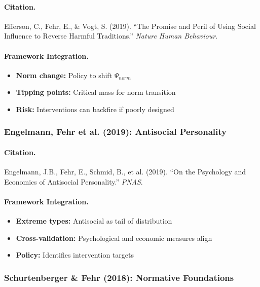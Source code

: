 \documentclass[12pt,a4paper]{article}
\begin{document}
\paragraph{Citation.}
Efferson, C., Fehr, E., \& Vogt, S. (2019).
``The Promise and Peril of Using Social Influence to Reverse Harmful Traditions.''
\emph{Nature Human Behaviour}.

\paragraph{Framework Integration.}
\begin{itemize}
  \item \textbf{Norm change:} Policy to shift $\Psi_{norm}$
  \item \textbf{Tipping points:} Critical mass for norm transition
  \item \textbf{Risk:} Interventions can backfire if poorly designed
\end{itemize}

\subsubsection{Engelmann, Fehr et al. (2019): Antisocial Personality}

\paragraph{Citation.}
Engelmann, J.B., Fehr, E., Schmid, B., et al. (2019).
``On the Psychology and Economics of Antisocial Personality.''
\emph{PNAS}.

\paragraph{Framework Integration.}
\begin{itemize}
  \item \textbf{Extreme types:} Antisocial as tail of distribution
  \item \textbf{Cross-validation:} Psychological and economic measures align
  \item \textbf{Policy:} Identifies intervention targets
\end{itemize}

\subsubsection{Schurtenberger \& Fehr (2018): Normative Foundations}
\end{document}
